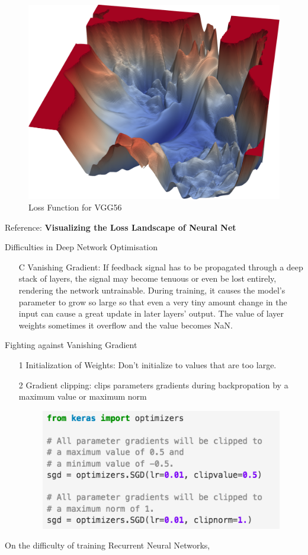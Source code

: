 \documentclass[xcolor=pdftex,dvipsnames,table,mathserif]{beamer}
\begin{document}
\begin{frame}
\begin{figure}
\includegraphics[width=.5\columnwidth]{../graphics/VGG56Loss}
\caption{Loss Function for VGG56}
\end{figure}
Reference: \textbf{Visualizing the Loss Landscape of Neural Net} \cite{li2017visualizing}
\end{frame}


\begin{frame}{Difficulties in Deep Network Optimisation}
\begin{itemize}
\item[C] {Vanishing Gradient:} If feedback signal has to be propagated through a deep stack of layers, the signal may become tenuous or even be lost entirely, rendering the network untrainable. During training, it causes the model's parameter to grow so large so that even a very tiny amount change in the input can cause a great update in later layers' output. The value of layer weights sometimes it overflow and the value becomes \alert{NaN}.
\end{itemize}
\end{frame}


\begin{frame}{Fighting against Vanishing Gradient}
\begin{enumerate}
\item[1] Initialization of Weights: Don't initialize to values that are too large.
\item[2] Gradient clipping: clips parameters gradients during backpropation by a maximum value or maximum norm 
\begin{figure}
\includegraphics[width=.75\columnwidth]{../graphics/KerasClip}
\end{figure}
\end{enumerate}
On the difficulty of training Recurrent Neural Networks, \cite{pascanu2013difficulty}
\end{frame}
\end{document}

